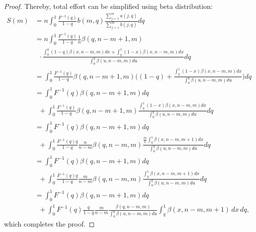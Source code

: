 \begin{proof}
Thereby, total effort can be simplified using beta distribution:
\[
\begin{aligned}
S(m) &=n\int_0^1\frac{F^{-1}(q)}{1-q}b(m,q)\frac{\sum_{j=1}^{m}a(j,q)}{\sum_{j=1}^{m}b(j,q)}dq 
\\&=n\int_0^1\frac{F^{-1}(q)}{1-q}\frac{1}{n}\beta(q,n-m+1,m)\\&\phantom{a}\cdot\frac{\int_0^q(1-q)\beta(x,n-m,m)dx+\int_q^1(1-x) \beta(x,n-m,m)dx}{\int_0^q\beta(u,n-m,m)du}dq \\&=\int_0^1\frac{F^{-1}(q)}{1-q}\beta(q,n-m+1,m)\big((1-q)+\frac{\int_q^1(1-x) \beta(x,n-m,m)dx}{\int_0^q\beta(u,n-m,m)du}\big)dq \\&=\int_0^1F^{-1}(q)\beta(q,n-m+1,m)dq\\&\phantom{a}+\int_0^1\frac{F^{-1}(q)}{1-q}\beta(q,n-m+1,m)\frac{\int_q^1(1-x) \beta(x,n-m,m)dx}{\int_0^q\beta(u,n-m,m)du}dq \\&=\int_0^1F^{-1}(q)\beta(q,n-m+1,m)dq\\ & \phantom{a}+\int_0^1\frac{F^{-1}(q)q}{1-q}\frac{n}{n-m}\beta(q,n-m,m)\frac{\frac{m}{n}\int_q^1\beta(x,n-m,m+1)dx}{\int_0^q\beta(u,n-m,m)du}dq \\&=\int_0^1F^{-1}(q)\beta(q,n-m+1,m)dq
\\ & \phantom{a}+\int_0^1\frac{F^{-1}(q)q}{1-q}\frac{m}{n-m}\beta(q,n-m,m)\frac{\int_q^1\beta(x,n-m,m+1)dx}{\int_0^q\beta(u,n-m,m)du}dq
\\ &= \int_0^1F^{-1}(q)\beta(q,n-m+1,m)dq\\&\phantom{a}+\int_0^1 F^{-1}(q)\frac{q}{1-q}\frac{m}{n-m}\frac{\beta(q,n-m,m)}{\int_0^q\beta(u,n-m,m)du}\int_q^1\beta(x,n-m,m+1)\,dx\,dq,
\end{aligned}
\]which completes the proof.
\end{proof}

